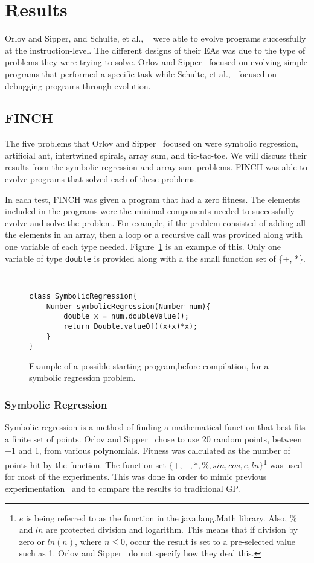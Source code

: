 \documentclass{sig-alternate}
\begin{document}
\section{Results}
Orlov and Sipper, and Schulte, et al., ~\cite{FINCH:2011, Assembly:2010} were able to evolve programs successfully at the instruction-level. The different designs of their EAs was due to the type of problems they were trying to solve. Orlov and Sipper~\cite{FINCH:2011} focused on evolving simple programs that performed a specific task while Schulte, et al.,~\cite{Assembly:2010} focused on debugging programs through evolution.

\subsection{FINCH}
The five problems that Orlov and Sipper~\cite{Assembly:2010} focused on were symbolic regression, artificial ant, intertwined spirals, array sum, and tic-tac-toe. We will discuss their results from the symbolic regression and array sum problems. FINCH was able to evolve programs that solved each of these problems.

In each test, FINCH was given a program that had a zero fitness. The elements included in the programs were the minimal components needed to successfully evolve and solve the problem. For example, if the problem consisted of adding all the elements in an array, then a loop or a recursive call was provided along with one variable of each type needed. Figure~\ref{regression} is an example of this. Only one variable of type \texttt{double} is provided along with a the small function set of \{+, *\}.

\begin{figure}
\centering
{\tt
\begin{verbatim}
class SymbolicRegression{
    Number symbolicRegression(Number num){
        double x = num.doubleValue();
        return Double.valueOf((x+x)*x);
    }
}
\end{verbatim}
}
\caption{Example of a possible starting program,before compilation, for a symbolic regression problem.}
\label{regression}
\end{figure}
\subsubsection{Symbolic Regression}
Symbolic regression is a method of finding a mathematical function that best fits a finite set of points. Orlov and Sipper~\cite{FINCH:2011} chose to use 20 random points, between ${-1}$ and 1, from various polynomials. Fitness was calculated as the number of points hit by the function. The function set ${\{+, -, *, \%, sin, cos, e, ln\}}$\footnote{$e$ is being referred to as the function in the java.lang.Math library. Also, $\%$ and $ln$ are protected division and logarithm. This means that if division by zero or $ln(n)$, where $n \le 0$, occur the result is set to a pre-selected value such as 1. Orlov and Sipper~\cite{FINCH:2011} do not specify how they deal this.} was used for most of the experiments. This was done in order to mimic previous experimentation~\cite{koza:1992} and to compare the results to traditional GP.
\end{document}
